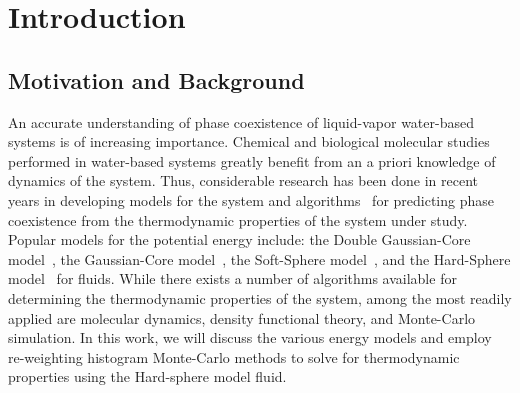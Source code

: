 \documentclass[letterpaper,twocolumn,amsmath,amssymb,pre,aps,10pt]{revtex4-1}
\begin{document}




\section{Introduction}

\subsection{Motivation and Background}

An accurate understanding of phase coexistence of liquid-vapor 
water-based systems is of increasing importance.  Chemical and 
biological molecular studies performed in water-based systems greatly 
benefit from an a priori knowledge of dynamics of the system.  Thus, 
considerable research has been done in recent years in developing 
models for the system and algorithms~\cite{wang1999transition, 
wang2002transition, swendsen1999transition, Broadhistogram, 
trebst2004optimizing, wessel2007optimized} for predicting phase 
coexistence from the thermodynamic properties of the system under 
study.  Popular models for the potential energy include:  the Double 
Gaussian-Core model~\cite{speranza2014phase, prestipino2014twofold}, 
the Gaussian-Core model~\cite{rane2013monte, krekelberg2009anomalous, 
mausbach2009solid}, the Soft-Sphere model~\cite{kreitzberg2015monte, 
torrie1977nonphysical}, and the Hard-Sphere 
model~\cite{hughes2013classical, lurie2014approach, krebs2014improved, 
schulte2015thesis, perlin2015thesis} for fluids.  While there exists a 
number of algorithms available for determining the thermodynamic 
properties of the system, among the most readily applied are molecular 
dynamics, density functional theory, and Monte-Carlo simulation.  In 
this work, we will discuss the various energy models and employ 
re-weighting histogram Monte-Carlo methods to solve for thermodynamic 
properties using the Hard-sphere model fluid.  
 
\end{document}
